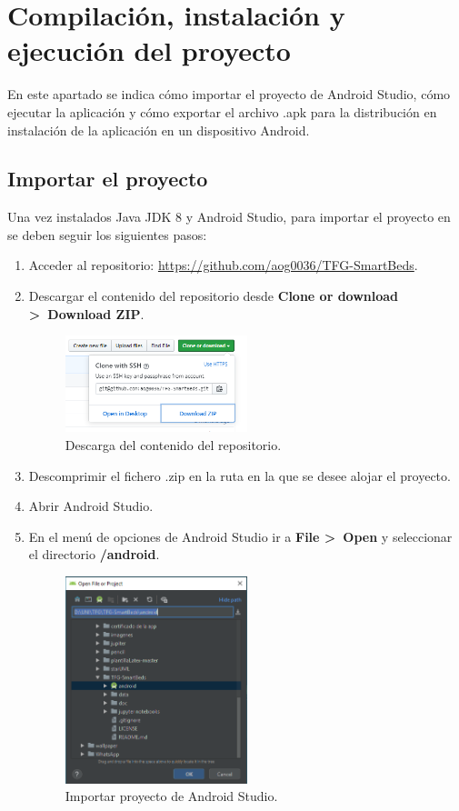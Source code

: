 \section{Compilación, instalación y ejecución del proyecto}

En este apartado se indica cómo importar el proyecto de Android Studio, cómo ejecutar la aplicación y cómo exportar el archivo .apk para la distribución en instalación de la aplicación en un dispositivo Android. 

\subsection{Importar el proyecto}

Una vez instalados Java JDK 8 y Android Studio, para importar el proyecto en se deben seguir los siguientes pasos: 

\begin{enumerate}
	\item Acceder al repositorio: \url{https://github.com/aog0036/TFG-SmartBeds}. 
	\item Descargar el contenido del repositorio desde \textbf{Clone or download >~Download ZIP}. 
	\begin{figure}[H]
		\centering
		\includegraphics[width=0.5\textwidth]{../img/download.png}
		\caption{Descarga del contenido del repositorio.}
		\label{fig:download}
	\end{figure}
	\item Descomprimir el fichero .zip en la ruta en la que se desee alojar el proyecto. 
	\item Abrir Android Studio. 
	\item En el menú de opciones de Android Studio ir a \textbf{File >~Open} y seleccionar el directorio \textbf{/android}. 
	\begin{figure}[H]
		\centering
		\includegraphics[width=0.5\textwidth]{../img/open.png}
		\caption{Importar proyecto de Android Studio.}
		\label{fig:open}
	\end{figure}
\end{enumerate}

